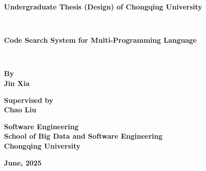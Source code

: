 \documentclass[UTF8,a4paper,12pt]{ctexart}
\numberwithin{equation}{section}
\begin{document}
\newpage
\thispagestyle{empty}
\setmainfont{Times New Roman}
\begin{center}
\textbf{
Undergraduate Thesis (Design) of Chongqing University}
\end{center}
~\\
\begin{center}
\textbf{Code Search System for Multi-Programming Language}
\end{center}

~\\
\renewcommand{\headrulewidth}{1pt}
\begin{figure}[htb] 
  \centering
     \end{figure}
     

\setmainfont{Times New Roman}
\begin{center}
\textbf{By}  \\
\textbf{Jin Xia}
\end{center}

\begin{center}
\textbf{Supervised by}\\
\textbf{Chao Liu}\\
\end{center}

\begin{center}
\textbf{Software Engineering}\\ %
\textbf{	School of Big Data and Software Engineering}\\ %
\textbf{Chongqing University}
\end{center}

\begin{center}
\textbf{June, 2025}
\end{center}


\newpage
\pagestyle{fancy}




\end{document}

